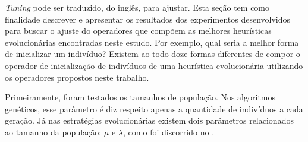 \textit{Tuning} pode ser traduzido, do inglês, para ajustar. Esta seção tem como 
finalidade descrever e apresentar os resultados dos experimentos desenvolvidos 
para buscar o ajuste do operadores que compõem as melhores heurísticas 
evolucionárias encontradas neste estudo. Por exemplo, qual seria a melhor forma 
de inicializar um indivíduo? Existem ao todo doze formas diferentes de compor 
o operador de inicialização de indivíduos de uma heurística evolucionária 
utilizando os operadores propostos neste trabalho.

Primeiramente, foram testados os tamanhos de população. Nos algoritmos genéticos, 
esse parâmetro é diz respeito apenas a quantidade de indivíduos a cada geração. 
Já nas estratégias evolucionárias existem dois parâmetros relacionados ao tamanho 
da população: $\mu$ e $\lambda$, como foi discorrido no .